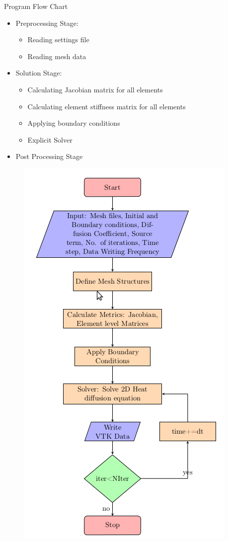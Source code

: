 \documentclass[t,english]{beamer}
\begin{document}
\begin{frame}[c]{Program Flow Chart}
\begin{multicols}{2}
\begin{itemize}
\item[1]Preprocessing Stage:
	\begin{itemize}
	\item Reading settings file
	\item Reading mesh data
	\end{itemize}
\item[2]Solution Stage:
	\begin{itemize}
	\item Calculating Jacobian matrix for all elements
	\item Calculating element stiffness matrix for all     elements
	\item Applying boundary conditions
	\item Explicit Solver
	\end{itemize}
\item[3] Post Processing Stage
\end{itemize}
\columnbreak
\begin{figure}[ht!]
\centering
\includegraphics[trim=0 0 0 150,scale=0.4]{serialflowchart.png}
\end{figure}
\end{multicols}
\end{frame}
\end{document}
